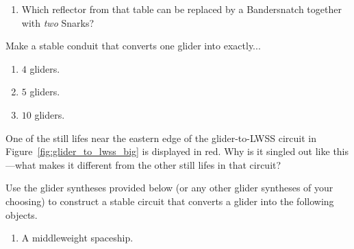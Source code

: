 \begin{multicols}{2}
\begin{problem}
\begin{enumerate}[label=\bf\color{ocre}(\alph*)]
			\item Which reflector from that table can be replaced by a Bandersnatch together with \emph{two} Snarks?
		\end{enumerate}
	\end{problem}
	
	
	\mfilbreak
	
	
	\begin{problemstar}\label{exer:convert_more_gliders} 
		Make a stable conduit that converts one glider into exactly...\smallskip
		
		\begin{enumerate}[label=\bf\color{ocre}(\alph*)]
			\item $4$ gliders.
			
			\item $5$ gliders.
			
			\item $10$ gliders.
		\end{enumerate}
	\end{problemstar}
	
	
	\mfilbreak
	
	
	\begin{problem}\label{exer:glider_to_lwss_weird_sl}
		One of the still lifes near the eastern edge of the glider-to-LWSS circuit in Figure~\ref{fig:glider_to_lwss_big} is displayed in red. Why is it singled out like this---what makes it different from the other still lifes in that circuit?
	\end{problem}
	
	
	\mfilbreak
	
	
	\begin{problem}\label{exer:convert_stable_g_to_spaceships}
		Use the glider syntheses provided below (or any other glider syntheses of your choosing) to construct a stable circuit that converts a glider into the following objects.\smallskip
		
		\begin{enumerate}[label=\bf\color{ocre}(\alph*)]
			\item A middleweight spaceship.
			

\end{enumerate}
\end{problem}
\end{multicols}
